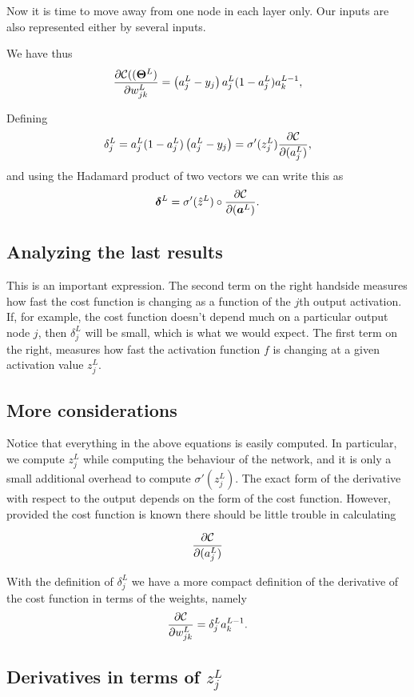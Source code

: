 \documentclass[%
oneside,                 %
final,                   %
10pt]{article}
\begin{document}
Now it is time to move away from one node in each layer only. Our inputs are also represented either by several inputs.

We have thus
\[
\frac{\partial{\cal C}((\bm{\Theta}^L)}{\partial w_{jk}^L}  =  \left(a_j^L - y_j\right)a_j^L(1-a_j^L)a_k^{L-1}, 
\]

Defining
\[
\delta_j^L = a_j^L(1-a_j^L)\left(a_j^L - y_j\right) = \sigma'(z_j^L)\frac{\partial {\cal C}}{\partial (a_j^L)},
\]
and using the Hadamard product of two vectors we can write this as
\[
\bm{\delta}^L = \sigma'(\hat{z}^L)\circ\frac{\partial {\cal C}}{\partial (\bm{a}^L)}.
\]

\subsection{Analyzing the last results}

This is an important expression. The second term on the right handside
measures how fast the cost function is changing as a function of the $j$th
output activation.  If, for example, the cost function doesn't depend
much on a particular output node $j$, then $\delta_j^L$ will be small,
which is what we would expect. The first term on the right, measures
how fast the activation function $f$ is changing at a given activation
value $z_j^L$.

\subsection{More considerations}

Notice that everything in the above equations is easily computed.  In
particular, we compute $z_j^L$ while computing the behaviour of the
network, and it is only a small additional overhead to compute
$\sigma'(z^L_j)$.  The exact form of the derivative with respect to the
output depends on the form of the cost function.
However, provided the cost function is known there should be little
trouble in calculating

\[
\frac{\partial {\cal C}}{\partial (a_j^L)}
\]

With the definition of $\delta_j^L$ we have a more compact definition of the derivative of the cost function in terms of the weights, namely
\[
\frac{\partial{\cal C}}{\partial w_{jk}^L}  =  \delta_j^La_k^{L-1}.
\]

\subsection{Derivatives in terms of $z_j^L$}
\end{document}
